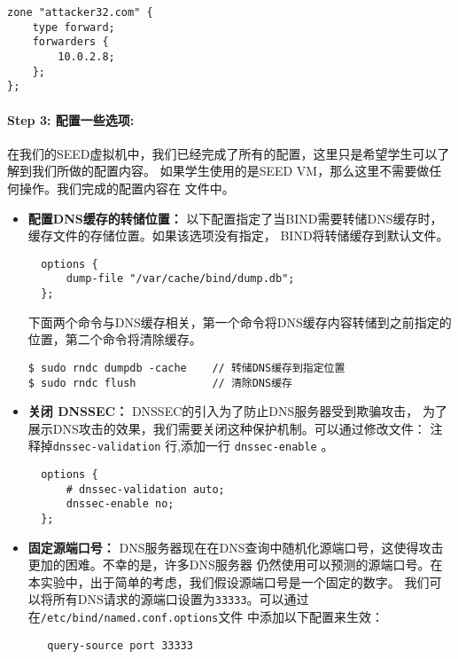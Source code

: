 \begin{lstlisting}
zone "attacker32.com" {
    type forward;
    forwarders {
        10.0.2.8;
    };
};
\end{lstlisting}
 


\paragraph{Step 3: 配置一些选项:} 
在我们的SEED虚拟机中，我们已经完成了所有的配置，这里只是希望学生可以了解到我们所做的配置内容。
如果学生使用的是SEED VM，那么这里不需要做任何操作。我们完成的配置内容在 文件中。


\begin{itemize} 
\item 
\textbf{配置DNS缓存的转储位置：} 
以下配置指定了当BIND需要转储DNS缓存时，缓存文件的存储位置。如果该选项没有指定，
BIND将转储缓存到默认文件。

\begin{lstlisting}
  options {
      dump-file "/var/cache/bind/dump.db";
  };
\end{lstlisting}

下面两个命令与DNS缓存相关，第一个命令将DNS缓存内容转储到之前指定的位置，第二个命令将清除缓存。


\begin{lstlisting}
$ sudo rndc dumpdb -cache    // 转储DNS缓存到指定位置
$ sudo rndc flush            // 清除DNS缓存
\end{lstlisting}


\item 
\textbf{关闭 DNSSEC：} 
DNSSEC的引入为了防止DNS服务器受到欺骗攻击，
为了展示DNS攻击的效果，我们需要关闭这种保护机制。可以通过修改文件：
注释掉{\tt dnssec-validation} 行,添加一行
{\tt dnssec-enable} 。

\begin{lstlisting}
  options {
      # dnssec-validation auto;
      dnssec-enable no;
  };
\end{lstlisting}


\item 
\textbf{固定源端口号：}
DNS服务器现在在DNS查询中随机化源端口号，这使得攻击更加的困难。不幸的是，许多DNS服务器
仍然使用可以预测的源端口号。在本实验中，出于简单的考虑，我们假设源端口号是一个固定的数字。
我们可以将所有DNS请求的源端口设置为{\tt 33333}。可以通过在{\tt /etc/bind/named.conf.options}文件
中添加以下配置来生效：


\begin{lstlisting}
   query-source port 33333
\end{lstlisting}

\end{itemize}



